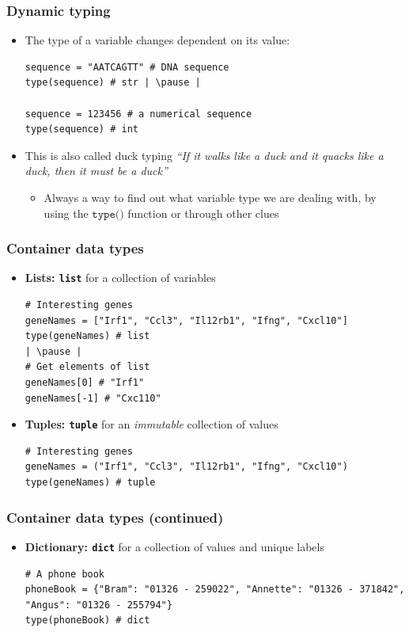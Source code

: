 \documentclass[xcolor=table]{beamer}
\begin{document}
\begin{frame}[fragile]
\frametitle{Dynamic typing}
\begin{itemize}
    \item The type of a variable changes dependent on its value:
\begin{lstlisting}[style=python]
sequence = "AATCAGTT" # DNA sequence 
type(sequence) # str | \pause |

sequence = 123456 # a numerical sequence
type(sequence) # int
\end{lstlisting}
\pause
    \item This is also called duck typing \emph{``If it walks like a duck and it quacks like a duck, then it must be a duck''}
        \begin{itemize}
            \item Always a way to find out what variable type we are dealing with, by using the $\texttt{type()}$ function or through other clues
        \end{itemize}
\end{itemize}
\end{frame}

\begin{frame}[fragile]
\frametitle{Container data types}

\begin{itemize}\addtolength{\itemsep}{-0.5\baselineskip}
\item<1-> \textbf{Lists: \texttt{list}} for a collection of variables
\begin{lstlisting}[style=python]
# Interesting genes
geneNames = ["Irf1", "Ccl3", "Il12rb1", "Ifng", "Cxcl10"]
type(geneNames) # list
| \pause |
# Get elements of list
geneNames[0] # "Irf1"
geneNames[-1] # "Cxc110"
\end{lstlisting}

\item<3-> \textbf{Tuples: \texttt{tuple}} for an \emph{immutable} collection of values
\begin{lstlisting}[style=python]
# Interesting genes
geneNames = ("Irf1", "Ccl3", "Il12rb1", "Ifng", "Cxcl10")
type(geneNames) # tuple
\end{lstlisting}
\end{itemize}
\end{frame}

\begin{frame}[fragile]
    \frametitle{Container data types (continued)}
\begin{itemize}\addtolength{\itemsep}{-0.5\baselineskip}
\item<4-> \textbf{Dictionary: \texttt{dict}} for a collection of values and unique labels 
\begin{lstlisting}[style=python]
# A phone book
phoneBook = {"Bram": "01326 - 259022", "Annette": "01326 - 371842", "Angus": "01326 - 255794"}
type(phoneBook) # dict
\end{lstlisting}

\end{itemize}
\end{frame}
\end{document}
